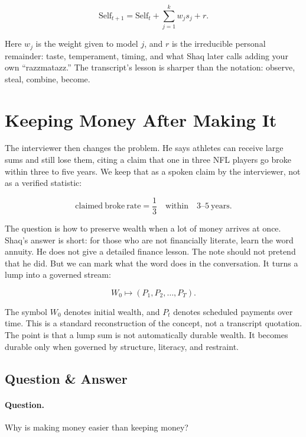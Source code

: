 \begin{equation}
\mathrm{Self}_{t+1}
=
\mathrm{Self}_{t}
+
\sum_{j=1}^{k} w_j s_j
+
r.
\end{equation}

Here \(w_j\) is the weight given to model \(j\), and \(r\) is the irreducible personal remainder: taste, temperament, timing, and what Shaq later calls adding your own ``razzmatazz.'' The transcript's lesson is sharper than the notation: observe, steal, combine, become.

\section{Keeping Money After Making It}

The interviewer then changes the problem. He says athletes can receive large sums and still lose them, citing a claim that one in three NFL players go broke within three to five years. We keep that as a spoken claim by the interviewer, not as a verified statistic:

\begin{equation}
\mathrm{claimed\ broke\ rate}
=
\frac{1}{3}
\quad
\mathrm{within}
\quad
3\text{--}5\ \mathrm{years}.
\end{equation}

The question is how to preserve wealth when a lot of money arrives at once. Shaq's answer is short: for those who are not financially literate, learn the word annuity. He does not give a detailed finance lesson. The note should not pretend that he did. But we can mark what the word does in the conversation. It turns a lump into a governed stream:

\begin{equation}
W_0 \longmapsto (P_1,P_2,\ldots,P_T).
\end{equation}

The symbol \(W_0\) denotes initial wealth, and \(P_t\) denotes scheduled payments over time. This is a standard reconstruction of the concept, not a transcript quotation. The point is that a lump sum is not automatically durable wealth. It becomes durable only when governed by structure, literacy, and restraint.

\subsection{Question \& Answer}

\paragraph{Question.}
Why is making money easier than keeping money?

